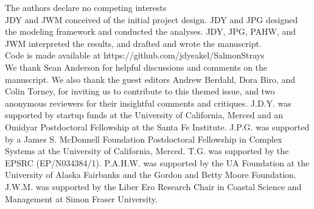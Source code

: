 \documentclass{revtex4}
\begin{document}
 The authors declare no competing interests
\\
 JDY and JWM conceived of the initial project design. JDY and JPG designed the modeling framework and conducted the analyses. JDY, JPG, PAHW, and JWM interpreted the results, and drafted and wrote the manuscript.
\\
 Code is made available at https://github.com/jdyeakel/SalmonStrays
\\
 We thank Sean Anderson for helpful discussions and comments on the manuscript. We also thank the guest editors Andrew Berdahl, Dora Biro, and Colin Torney, for inviting us to contribute to this themed issue, and two anonymous reviewers for their insightful comments and critiques. J.D.Y. was supported by startup funds at the University of California, Merced and an Omidyar Postdoctoral Fellowship at the Santa Fe Institute. J.P.G. was supported by a James S. McDonnell Foundation Postdoctoral Fellowship in Complex Systems at the University of California, Merced. T.G. was supported by the EPSRC (EP/N034384/1). P.A.H.W. was supported by the UA Foundation at the University of Alaska Fairbanks and the Gordon and Betty Moore Foundation. J.W.M. was supported by the Liber Ero Research Chair in Coastal Science and Management at Simon Fraser University.

% 
\end{document}
